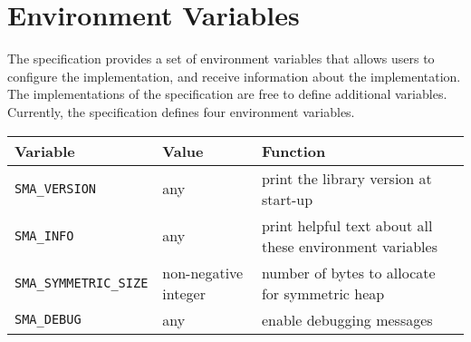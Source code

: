 
\section{Environment Variables }

The \openshmem specification provides a set of environment variables that allows users
to configure the \openshmem implementation, and receive information about the 
implementation. The implementations of the specification are free to define additional variables. Currently, the specification defines four environment variables.

\medskip{}


\begin{tabular}{|l|l|l|}
\hline 
Variable & Value & Function\tabularnewline
\hline 
\hline 
\texttt{SMA\_VERSION} & any & print the library version at start-up\tabularnewline
\hline 
\texttt{SMA\_INFO} & any & print helpful text about all these environment variables\tabularnewline
\hline 
\texttt{SMA\_SYMMETRIC\_SIZE} & non-negative integer & number of bytes to allocate for symmetric heap\tabularnewline
\hline 
\texttt{SMA\_DEBUG} & any & enable debugging messages\tabularnewline
\hline 
\end{tabular}

\medskip{}

